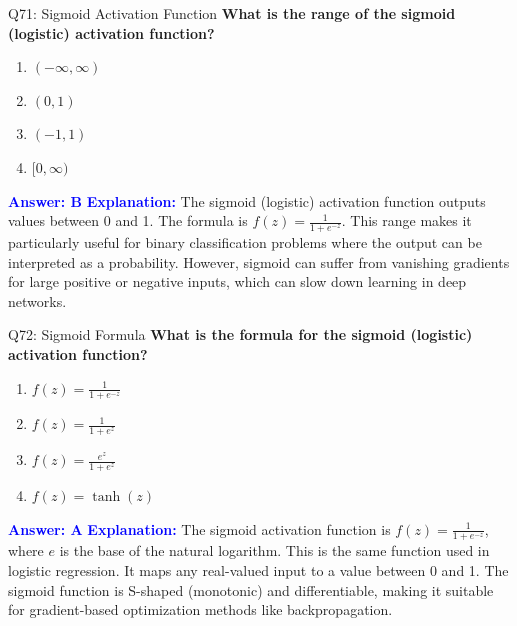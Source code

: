 \documentclass[8pt]{beamer}
\begin{document}
	\begin{frame}{Q71: Sigmoid Activation Function}
		\fontsize{6.5}{7.5}\selectfont
		\textbf{What is the range of the sigmoid (logistic) activation function?}
		\begin{enumerate}
			\item $(-\infty, \infty)$
			\item $(0, 1)$
			\item $(-1, 1)$
			\item $[0, \infty)$
		\end{enumerate}
		\vspace{0.1cm}
		\textcolor{blue}{\textbf{Answer: B}}
		\vspace{0.1cm}
		\textcolor{blue}{\textbf{Explanation:}} The sigmoid (logistic) activation function outputs values between 0 and 1. The formula is $f(z) = \frac{1}{1 + e^{-z}}$. This range makes it particularly useful for binary classification problems where the output can be interpreted as a probability. However, sigmoid can suffer from vanishing gradients for large positive or negative inputs, which can slow down learning in deep networks.
	\end{frame}
	
	\begin{frame}{Q72: Sigmoid Formula}
		\fontsize{6.5}{7.5}\selectfont
		\textbf{What is the formula for the sigmoid (logistic) activation function?}
		\begin{enumerate}
			\item $f(z) = \frac{1}{1 + e^{-z}}$
			\item $f(z) = \frac{1}{1 + e^{z}}$
			\item $f(z) = \frac{e^z}{1 + e^z}$
			\item $f(z) = \tanh(z)$
		\end{enumerate}
		\vspace{0.1cm}
		\textcolor{blue}{\textbf{Answer: A}}
		\vspace{0.1cm}
		\textcolor{blue}{\textbf{Explanation:}} The sigmoid activation function is $f(z) = \frac{1}{1 + e^{-z}}$, where $e$ is the base of the natural logarithm. This is the same function used in logistic regression. It maps any real-valued input to a value between 0 and 1. The sigmoid function is S-shaped (monotonic) and differentiable, making it suitable for gradient-based optimization methods like backpropagation.
	\end{frame}
	
\end{document}
